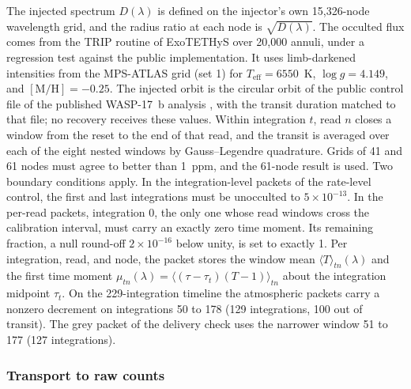 The injected spectrum $D(\lambda)$ is defined on the injector's own
15{,}326-node wavelength grid, and the radius ratio at each node is
$\sqrt{D(\lambda)}$. The occulted flux comes from the TRIP routine of
ExoTETHyS \citep{MorelloEtAl2020} over 20{,}000 annuli, under a
regression test against the public implementation. It uses
limb-darkened intensities from the MPS-ATLAS grid (set 1)
\citep{KostogryzEtAl2022,KostogryzEtAl2023} for $T_{\mathrm{eff}}=6550$~K,
$\log g=4.149$, and $[\mathrm{M}/\mathrm{H}]=-0.25$. The injected orbit
is the circular orbit of the public control file of the published
WASP-17~b analysis \citep{LouieEtAl2025}, with the transit duration
matched to that file; no recovery receives these values. Within
integration $t$, read $n$ closes a window from the reset to the end of
that read, and the transit is averaged over each of the eight nested
windows by Gauss--Legendre quadrature. Grids of 41 and 61 nodes must
agree to better than 1~ppm, and the 61-node result is used. Two boundary
conditions apply. In the integration-level packets of the rate-level
control, the first and last integrations must be unocculted to
$5\times10^{-13}$. In the per-read packets, integration 0, the only one
whose read windows cross the calibration interval, must carry an exactly
zero time moment. Its remaining fraction, a null round-off
$2\times10^{-16}$ below unity, is set to exactly 1. Per integration,
read, and node, the packet stores the window mean
$\langle T\rangle_{tn}(\lambda)$ and the first time moment
$\mu_{tn}(\lambda)=\langle(\tau-\tau_t)(T-1)\rangle_{tn}$ about the
integration midpoint $\tau_t$. On the 229-integration timeline the
atmospheric packets carry a nonzero decrement on integrations 50 to 178
(129 integrations, 100 out of transit). The grey packet of the delivery
check uses the narrower window 51 to 177 (127 integrations).

\subsubsection{Transport to raw counts}


